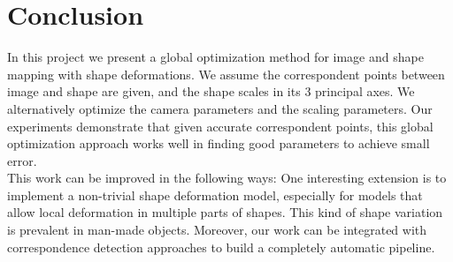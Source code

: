 \documentclass[10pt,twocolumn,letterpaper]{article}
\begin{document}
\section{Conclusion}

\noindent
In this project we present a global optimization method for image and shape mapping with shape deformations. We assume the correspondent points between image and shape are given, and the shape scales in its 3 principal axes. We alternatively optimize the camera parameters and the scaling parameters. Our experiments demonstrate that given accurate correspondent points, this global optimization approach works well in finding good parameters to achieve small error.\\

\noindent
This work can be improved in the following ways: One interesting extension is to implement a non-trivial shape deformation model, especially for models that allow local deformation in multiple parts of shapes. This kind of shape variation is prevalent in man-made objects. Moreover, our work can be integrated with correspondence detection approaches to build a completely automatic pipeline.

{\small


}
\end{document}
